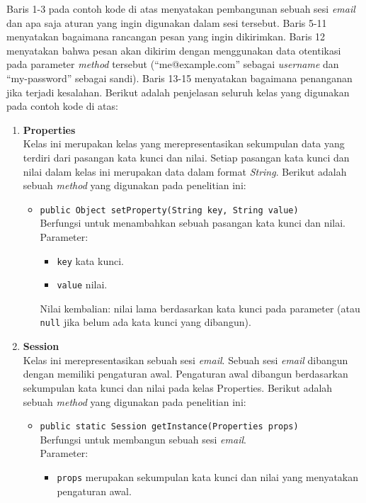 Baris 1-3 pada contoh kode di atas menyatakan pembangunan sebuah sesi \textit{email} dan apa saja aturan yang ingin digunakan dalam sesi tersebut. Baris 5-11 menyatakan bagaimana rancangan pesan yang ingin dikirimkan. Baris 12 menyatakan bahwa pesan akan dikirim dengan menggunakan data otentikasi pada parameter \textit{method} tersebut (``me@example.com'' sebagai \textit{username} dan ``my-password'' sebagai sandi). Baris 13-15 menyatakan bagaimana penanganan jika terjadi kesalahan. Berikut adalah penjelasan seluruh kelas yang digunakan pada contoh kode di atas:
\begin{enumerate}
	\item \textbf{Properties}\\
	Kelas ini merupakan kelas yang merepresentasikan sekumpulan data yang terdiri dari pasangan kata kunci dan nilai. Setiap pasangan kata kunci dan nilai dalam kelas ini merupakan data dalam format \textit{String}.
	Berikut adalah sebuah \textit{method} yang digunakan pada penelitian ini:
		\begin{itemize}
			\item \texttt{public Object setProperty(String key, String value)}\\
			Berfungsi untuk menambahkan sebuah pasangan kata kunci dan nilai.\\
			Parameter:
				\begin{itemize}
					\item \texttt{key} kata kunci.
					\item \texttt{value} nilai.
				\end{itemize}
			Nilai kembalian: nilai lama berdasarkan kata kunci pada parameter (atau \texttt{null} jika belum ada kata kunci yang dibangun).
		\end{itemize}
	\item \textbf{Session}\\
	Kelas ini merepresentasikan sebuah sesi \textit{email}. Sebuah sesi \textit{email} dibangun dengan memiliki pengaturan awal. Pengaturan awal dibangun berdasarkan sekumpulan kata kunci dan nilai pada kelas Properties.
	Berikut adalah sebuah \textit{method} yang digunakan pada penelitian ini:
		\begin{itemize}
			\item \texttt{public static Session getInstance(Properties props)}\\
			Berfungsi untuk membangun sebuah sesi \textit{email}.\\
			Parameter:
				\begin{itemize}
					\item \texttt{props} merupakan sekumpulan kata kunci dan nilai yang menyatakan pengaturan awal.

\end{itemize}
\end{itemize}
\end{enumerate}
